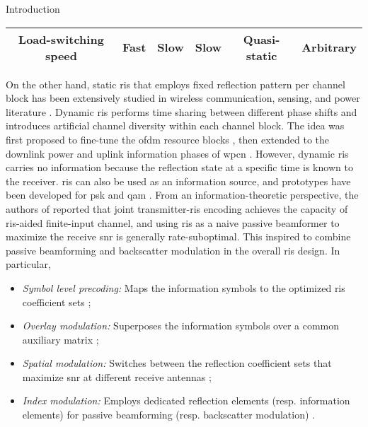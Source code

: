 \begin{section}{Introduction}
\begin{sidewaystable}
\begin{tabularx}{\textwidth}{CCCCCC}
			Load-switching speed                   & Fast                                    & Slow                        & Slow                                                                & Quasi-static        & Arbitrary                                                          \\ \bottomrule
		\end{tabularx}
	\end{sidewaystable}

	On the other hand, static \gls{ris} that employs fixed reflection pattern per channel block has been extensively studied in wireless communication, sensing, and power literature \cite{Wu2018,Zhang2019a,Lin2022,Liu2022,Feng2022,Zhao2022}.
	Dynamic \gls{ris} performs time sharing between different phase shifts and introduces artificial channel diversity within each channel block.
	The idea was first proposed to fine-tune the \gls{ofdm} resource blocks \cite{Yang2020}, then extended to the downlink power and uplink information phases of \gls{wpcn} \cite{Wu2021,Wu2021d,Hua2022a}.
	However, dynamic \gls{ris} carries no information because the reflection state at a specific time is known to the receiver.
	\gls{ris} can also be used as an information source, and prototypes have been developed for \gls{psk} \cite{Tang2019b} and \gls{qam} \cite{Dai2020a}.
	From an information-theoretic perspective, the authors of \cite{Karasik2020} reported that joint transmitter-\gls{ris} encoding achieves the capacity of \gls{ris}-aided finite-input channel, and using \gls{ris} as a naive passive beamformer to maximize the receive \gls{snr} is generally rate-suboptimal.
	This inspired \cite{Liu2019d,Bereyhi2020,Xu2020b,Zhang2021d,Hu2021b,Hua2022,Basar2020,Ma2020a,Yuan2021,Hu2021a} to combine passive beamforming and backscatter modulation in the overall \gls{ris} design.
	In particular,
	\begin{itemize}
		\item \emph{Symbol level precoding:} Maps the information symbols to the optimized \gls{ris} coefficient sets \cite{Liu2019d,Bereyhi2020};
		\item \emph{Overlay modulation:} Superposes the information symbols over a common auxiliary matrix \cite{Xu2020b,Zhang2021d,Hu2021b,Hua2022};
		\item \emph{Spatial modulation:} Switches between the reflection coefficient sets that maximize \gls{snr} at different receive antennas \cite{Basar2020,Ma2020a,Yuan2021};
		\item \emph{Index modulation:} Employs dedicated reflection elements (resp. information elements) for passive beamforming (resp. backscatter modulation) \cite{Hu2021a}.

\end{itemize}
\end{section}
